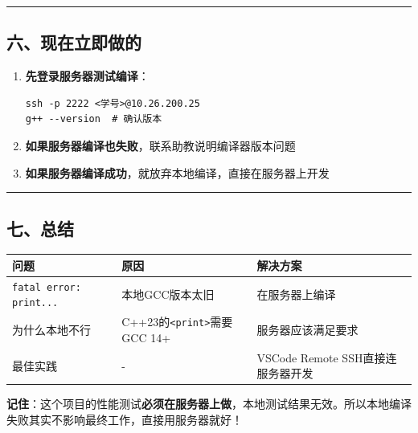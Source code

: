 \documentclass[11pt, a4paper]{article}
\begin{document}
\begin{aibox}
\begin{center}\rule{\textwidth}{0.4pt}\end{center}

\subsection*{六、现在立即做的}

\begin{enumerate}
    \item \textbf{先登录服务器测试编译}：
\begin{tcolorbox}[colback=white,colframe=gray!50!white,boxrule=0.5pt,arc=2pt,left=5pt,right=5pt,top=5pt,bottom=5pt]
\begin{verbatim}
ssh -p 2222 <学号>@10.26.200.25
g++ --version  # 确认版本
\end{verbatim}
\end{tcolorbox}
    \item \textbf{如果服务器编译也失败}，联系助教说明编译器版本问题
    \item \textbf{如果服务器编译成功}，就放弃本地编译，直接在服务器上开发
\end{enumerate}

\begin{center}\rule{\textwidth}{0.4pt}\end{center}

\subsection*{七、总结}

\vspace{0.5em}
\begin{tabularx}{\textwidth}{@{} X X X @{}}
\toprule
问题 & 原因 & 解决方案 \\
\midrule
\texttt{fatal error: print...} & 本地GCC版本太旧 & 在服务器上编译 \\
为什么本地不行 & C++23的\texttt{\textless print\textgreater}需要GCC 14+ & 服务器应该满足要求 \\
最佳实践 & - & VSCode Remote SSH直接连服务器开发 \\
\bottomrule
\end{tabularx}
\vspace{0.5em}

\textbf{记住}：这个项目的性能测试\textbf{必须在服务器上做}，本地测试结果无效。所以本地编译失败其实不影响最终工作，直接用服务器就好！
\end{aibox}

\vspace{1.5em}
\end{document}
